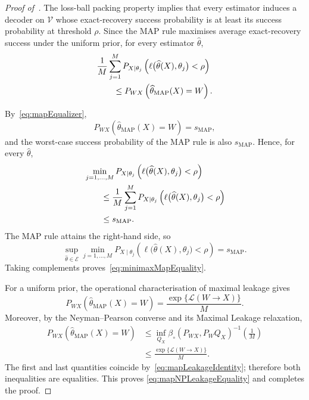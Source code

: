 \documentclass[11pt]{article}
\theoremstyle{definition}
\theoremstyle{remark}
\newcommand{\1}{\boldsymbol{1}}
\newcommand{\ml}[2]{\mathcal{L}(#1\!\to\!#2)}
\begin{document}
\begin{proof}[Proof of~]
The loss-ball packing property implies that every estimator induces a
decoder on $\mathcal V$ whose exact-recovery success probability is at
least its success probability at threshold $\rho$. Since the MAP rule
maximises average exact-recovery success under the uniform prior, for
every estimator $\widehat\theta$,
\begin{align}
&\frac1M
\sum_{j=1}^M
P_{X\mid\theta_j}
\left(
\ell\bigl(\widehat\theta(X),\theta_j\bigr)<\rho
\right)
\notag\\
&\qquad\leq
P_{WX}
\left(
\widehat\theta_{\mathrm{MAP}}(X)=W
\right).
\label{eq:mapAverageOptimality}
\end{align}

By~\eqref{eq:mapEqualizer},
\begin{equation}
P_{WX}
\left(
\widehat\theta_{\mathrm{MAP}}(X)=W
\right)
=
s_{\mathrm{MAP}},
\end{equation}
and the worst-case success probability of the MAP rule is also
$s_{\mathrm{MAP}}$. Hence, for every $\widehat\theta$,
\begin{align}
&\min_{j=1,\ldots,M}
P_{X\mid\theta_j}
\left(
\ell\bigl(\widehat\theta(X),\theta_j\bigr)<\rho
\right)
\notag\\
&\qquad\leq
\frac1M
\sum_{j=1}^M
P_{X\mid\theta_j}
\left(
\ell\bigl(\widehat\theta(X),\theta_j\bigr)<\rho
\right)
\notag\\
&\qquad\leq s_{\mathrm{MAP}}.
\end{align}
The MAP rule attains the right-hand side, so
\begin{equation}
\sup_{\widehat\theta\in\mathcal E}
\min_{j=1,\ldots,M}
P_{X\mid\theta_j}
\left(
\ell\bigl(\widehat\theta(X),\theta_j\bigr)<\rho
\right)
=
s_{\mathrm{MAP}}.
\end{equation}
Taking complements proves~\eqref{eq:minimaxMapEquality}.

For a uniform prior, the operational characterisation of maximal
leakage gives
\begin{equation}
P_{WX}
\left(
\widehat\theta_{\mathrm{MAP}}(X)=W
\right)
=
\frac{\exp\{\ml{W}{X}\}}{M}.
\label{eq:mapLeakageIdentity}
\end{equation}
Moreover, by the Neyman--Pearson converse and its Maximal Leakage
relaxation,
\begin{align}
P_{WX}
\left(
\widehat\theta_{\mathrm{MAP}}(X)=W
\right)
&\leq
\inf_{Q_X}
\beta_{\circ}(P_{WX},P_WQ_X)^{-1}
\left(\frac1M\right)\\
&\leq
\frac{\exp\{\ml{W}{X}\}}{M}.
\end{align}
The first and last quantities coincide by~\eqref{eq:mapLeakageIdentity};
therefore both inequalities are equalities. This proves
\eqref{eq:mapNPLeakageEquality} and completes the proof.
\end{proof}
\end{document}
